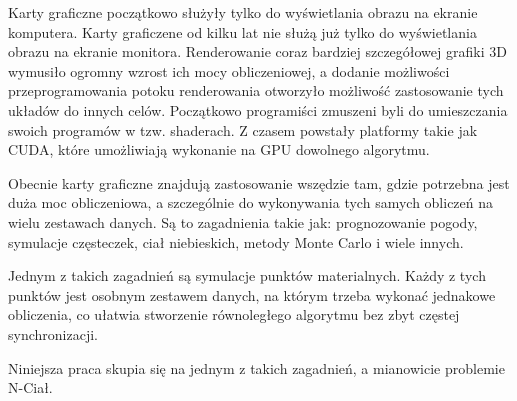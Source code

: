 


Karty graficzne początkowo służyły tylko do wyświetlania obrazu na ekranie komputera.
Karty graficzene od kilku lat nie służą już tylko do wyświetlania obrazu na ekranie monitora. Renderowanie coraz bardziej szczegółowej grafiki 3D wymusiło ogromny wzrost ich mocy obliczeniowej, a dodanie możliwości przeprogramowania potoku renderowania otworzyło możliwość zastosowanie tych układów do innych celów.
Początkowo programiści zmuszeni byli do umieszczania swoich programów w tzw. shaderach. 
Z czasem powstały platformy takie jak CUDA, które umożliwiają wykonanie na GPU dowolnego algorytmu. 

Obecnie karty graficzne znajdują zastosowanie wszędzie tam, gdzie potrzebna jest duża moc obliczeniowa, a szczególnie do wykonywania tych samych obliczeń na wielu zestawach danych.
Są to zagadnienia takie jak: prognozowanie pogody, symulacje częsteczek, ciał niebieskich, metody Monte Carlo i wiele innych. \linebreak %





Jednym z takich zagadnień są symulacje punktów materialnych. 
Każdy z tych punktów jest osobnym zestawem danych, na którym trzeba wykonać jednakowe obliczenia, co ułatwia stworzenie równoległego algorytmu bez zbyt częstej synchronizacji.

Niniejsza praca skupia się na jednym z takich zagadnień, a mianowicie problemie N-Ciał.\linebreak



